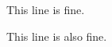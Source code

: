 \documentclass{article}
\begin{document}
This line is fine.

\badcommand
This line is also fine.
\end{document}
